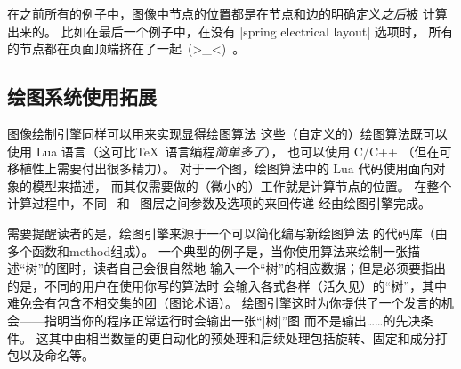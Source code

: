 在之前所有的例子中，图像中节点的位置都是在节点和边的明确定义\emph{之后}被
计算出来的。
比如在最后一个例子中，在没有 |spring electrical layout| 选项时，
所有的节点都在页面顶端挤在了一起\ (>\_<)\ 。


\subsection{绘图系统使用拓展}

图像绘制引擎同样可以用来实现显得绘图算法
这些（自定义的）绘图算法既可以使用 Lua 语言（这可比\TeX\ 语言编程\emph{简单多了}），
也可以使用 C/C++ （但在可移植性上需要付出很多精力）。
对于一个图，绘图算法中的 Lua 代码使用面向对象的模型来描述，
而其仅需要做的（微小的）工作就是计算节点的位置。
在整个计算过程中，不同 \tikzname\ 和 \pgfname\ 图层之间参数及选项的来回传递
经由绘图引擎完成。

需要提醒读者的是，绘图引擎来源于一个可以简化编写新绘图算法
的代码库（由多个函数和method组成）。
一个典型的例子是，当你使用算法来绘制一张描述“树”的图时，读者自己会很自然地
输入一个“树”的相应数据；但是必须要指出的是，不同的用户在使用你写的算法时
会输入各式各样（活久见）的“树”，其中难免会有包含不相交集的团（图论术语）。
绘图引擎这时为你提供了一个发言的机会——指明当你的程序正常运行时会输出一张“|树|”图
而不是输出……的先决条件。
这其中由相当数量的更自动化的预处理和后续处理包括旋转、固定和成分打包以及命名等。


